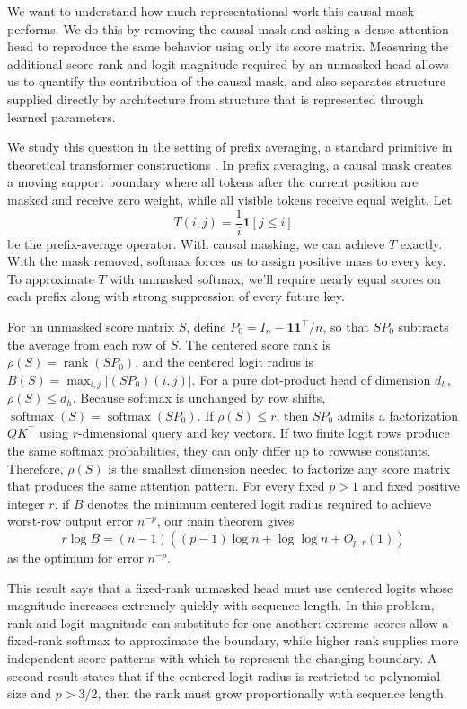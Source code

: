 \documentclass[10pt]{article} %
\theoremstyle{definition}
\DeclareMathOperator{\rank}{rank}
\newcommand{\one}{\mathbf 1}
\newcommand{\softmax}{\operatorname{softmax}}
\begin{document}
We want to understand how much representational work this causal mask
performs. We do this by removing the causal mask and asking a dense attention
head to reproduce the same behavior using only its score matrix. Measuring the
additional score rank and logit magnitude required by an unmasked head allows
us to quantify the contribution of the causal mask, and also separates
structure supplied directly by architecture from structure that is represented
through learned parameters.

We study this question in the setting of prefix averaging, a standard
primitive in theoretical transformer constructions
\citep{yang2025cookbook,strobl2025}. In prefix averaging, a causal mask creates
a moving support boundary where all tokens after the current position are
masked and receive zero weight, while all visible tokens receive equal weight.
Let
\[
 T(i,j)=\frac1i\mathbf 1[j\le i]
\]
be the prefix-average operator. With causal masking, we can achieve \(T\)
exactly. With the mask removed, softmax forces us to assign positive mass to
every key. To approximate \(T\) with unmasked softmax, we'll require nearly
equal scores on each prefix along with strong suppression of every future key.

For an unmasked score matrix \(S\), define
\(P_0=I_n-\one\one^\top/n\), so that \(SP_0\) subtracts the average from each
row of \(S\). The centered score rank is \(\rho(S)=\rank(SP_0)\), and the
centered logit radius is \(B(S)=\max_{i,j}|(SP_0)(i,j)|\). For a pure
dot-product head of dimension \(d_h\), \(\rho(S)\le d_h\). Because softmax is
unchanged by row shifts, \(\softmax(S)=\softmax(SP_0)\). If \(\rho(S)\le r\),
then \(SP_0\) admits a factorization \(QK^\top\) using \(r\)-dimensional query
and key vectors. If two finite logit rows produce the same softmax
probabilities, they can only differ up to rowwise constants. Therefore,
\(\rho(S)\) is the smallest dimension needed to factorize any score matrix
that produces the same attention pattern. For every fixed \(p>1\) and fixed
positive integer \(r\), if \(B\) denotes the minimum centered logit radius
required to achieve worst-row output error \(n^{-p}\), our main theorem gives
\[
 r\log B
 =(n-1)\left((p-1)\log n+\log\log n+O_{p,r}(1)\right)
\]
as the optimum for error \(n^{-p}\).

This result says that a fixed-rank unmasked head must use centered logits whose
magnitude increases extremely quickly with sequence length. In this problem,
rank and logit magnitude can substitute for one another: extreme scores allow
a fixed-rank softmax to approximate the boundary, while higher rank supplies
more independent score patterns with which to represent the changing
boundary. A second result states that if the centered logit radius is
restricted to polynomial size and \(p>3/2\), then the rank must grow
proportionally with sequence length.
\end{document}
